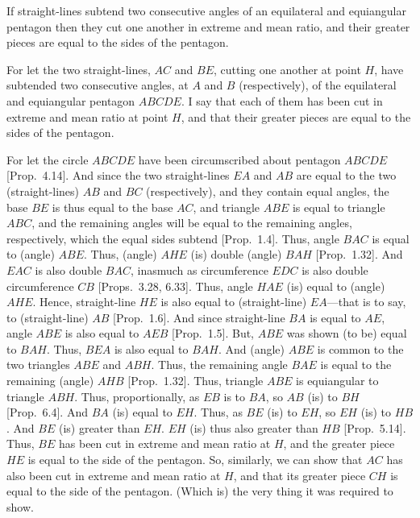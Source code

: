 If straight-lines subtend two consecutive angles of an equilateral and equiangular pentagon then they cut one another in extreme and
mean ratio, and their greater pieces are equal to  the sides of the pentagon.

\centerline{}

For let the two straight-lines, $AC$ and $BE$, cutting one another
at point $H$, have subtended  two consecutive angles, at $A$ and $B$ (respectively), of
the equilateral and equiangular pentagon $ABCDE$. I say that
each of them has been cut in extreme and mean ratio at point $H$, and
that their greater pieces are equal to the sides of the pentagon.

For let the circle $ABCDE$ have been circumscribed about pentagon
$ABCDE$ [Prop.~4.14]. And since the two straight-lines $EA$ and
$AB$ are equal to the two (straight-lines) $AB$ and $BC$ (respectively),
and they contain equal angles, the base $BE$ is thus equal to the base
$AC$, and triangle $ABE$ is equal to triangle $ABC$, and the remaining
angles will be equal to the remaining angles, respectively,
which the equal sides subtend [Prop.~1.4]. Thus, angle $BAC$ is equal
to (angle) $ABE$. Thus, (angle) $AHE$ (is) double (angle) $BAH$ [Prop.~1.32]. And $EAC$ is also double $BAC$, inasmuch as
circumference $EDC$ is also double circumference $CB$ [Props.~3.28, 6.33].
Thus, angle $HAE$ (is) equal to (angle) $AHE$. Hence, straight-line
$HE$ is also equal to (straight-line) $EA$---that is to say, to (straight-line)
$AB$ [Prop.~1.6]. And since straight-line $BA$ is equal to $AE$,
angle $ABE$ is also equal to $AEB$ [Prop.~1.5]. But, $ABE$
was shown (to be) equal to $BAH$. Thus, $BEA$ is also equal to
$BAH$. And (angle) $ABE$ is common to the two triangles
$ABE$ and $ABH$. Thus, the remaining angle $BAE$ is equal to
the remaining (angle) $AHB$ [Prop.~1.32]. Thus, triangle $ABE$
is equiangular to triangle $ABH$. Thus, proportionally, as $EB$ is
to $BA$, so $AB$ (is) to $BH$ [Prop.~6.4].  And $BA$ (is) equal to
$EH$. Thus, as $BE$ (is) to $EH$, so $EH$ (is) to $HB$. And
$BE$ (is) greater than $EH$.  $EH$ (is) thus also greater than $HB$
[Prop.~5.14]. Thus, $BE$ has been cut in extreme and mean ratio at
$H$, and the greater piece $HE$ is equal to the side of the pentagon. 
So, similarly, we can show that $AC$ has also been cut in extreme and
mean ratio at $H$, and that  its greater piece $CH$ is equal to the side
of the pentagon. (Which is) the very thing it was required to show.


